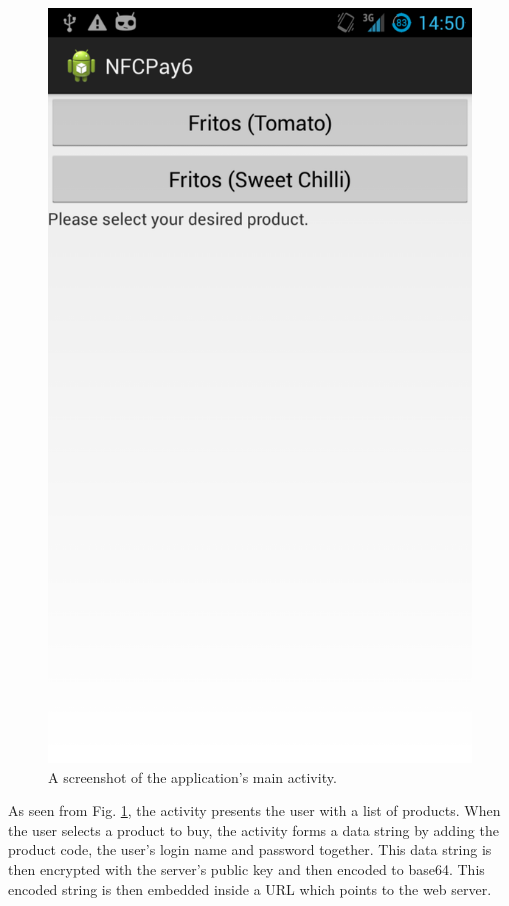 \begin{figure}
 \centering 
 \includegraphics[clip = true, trim = 0 850 0 60,
 scale=0.2]{main_screenshot}
 \caption{A screenshot of the application's main activity.}
 \label{fig:main-activity-screenshot}
\end{figure}

As seen from Fig. \ref{fig:main-activity-screenshot}, the activity presents
the user with a list of products. When the user selects a product to buy, the
activity forms a data string by adding the product code, the user's login
name and password together. This data string is then encrypted with the
server's public key and then encoded to base64. This encoded string
is then embedded inside a URL which points to the web server. 

